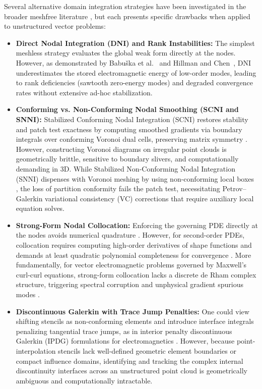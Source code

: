 \documentclass[preprint,12pt]{elsarticle}
\begin{document}
Several alternative domain integration strategies have been investigated in the broader meshfree literature \cite{hillman2018performance}, but each presents specific drawbacks when applied to unstructured vector problems:
\begin{itemize}
    \item \textbf{Direct Nodal Integration (DNI) and Rank Instabilities:} The simplest meshless strategy evaluates the global weak form directly at the nodes. However, as demonstrated by Babu{\v{s}}ka et al.~\cite{babuska2008quadrature} and Hillman and Chen~\cite{hillman2018performance}, DNI underestimates the stored electromagnetic energy of low-order modes, leading to rank deficiencies (sawtooth zero-energy modes) and degraded convergence rates without extensive ad-hoc stabilization.
    \item \textbf{Conforming vs. Non-Conforming Nodal Smoothing (SCNI and SNNI):} Stabilized Conforming Nodal Integration (SCNI) \cite{chen2001stabilized} restores stability and patch test exactness by computing smoothed gradients via boundary integrals over conforming Voronoi dual cells, preserving matrix symmetry \cite{hillman2018performance}. However, constructing Voronoi diagrams on irregular point clouds is geometrically brittle, sensitive to boundary slivers, and computationally demanding in 3D. While Stabilized Non-Conforming Nodal Integration (SNNI) dispenses with Voronoi meshing by using non-conforming local boxes \cite{hillman2018performance}, the loss of partition conformity fails the patch test, necessitating Petrov--Galerkin variational consistency (VC) corrections \cite{chen2013arbitrary, hillman2018performance} that require auxiliary local equation solves.
    \item \textbf{Strong-Form Nodal Collocation:} Enforcing the governing PDE directly at the nodes avoids numerical quadrature \cite{hillman2018performance}. However, for second-order PDEs, collocation requires computing high-order derivatives of shape functions and demands at least quadratic polynomial completeness for convergence \cite{hillman2018performance}. More fundamentally, for vector electromagnetic problems governed by Maxwell's curl-curl equations, strong-form collocation lacks a discrete de Rham complex structure, triggering spectral corruption and unphysical gradient spurious modes \cite{bossavit1990spurious, boffi2006finite}.
    \item \textbf{Discontinuous Galerkin with Trace Jump Penalties:} One could view shifting stencils as non-conforming elements and introduce interface integrals penalizing tangential trace jumps, as in interior penalty discontinuous Galerkin (IPDG) formulations for electromagnetics \cite{houston2004mixed, hesthaven2004high}. However, because point-interpolation stencils lack well-defined geometric element boundaries or compact influence domains, identifying and tracking the complex internal discontinuity interfaces across an unstructured point cloud is geometrically ambiguous and computationally intractable.

\end{itemize}
\end{document}
